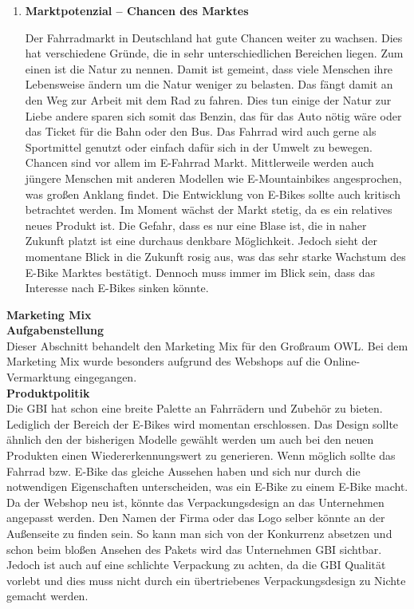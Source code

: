 \begin{enumerate}
	\item{\textbf{Marktpotenzial – Chancen des Marktes}}
	
Der Fahrradmarkt in Deutschland hat gute Chancen weiter zu wachsen. Dies hat verschiedene Gründe, die in sehr unterschiedlichen Bereichen liegen. Zum einen ist die Natur zu nennen. Damit ist gemeint, dass viele Menschen ihre Lebensweise ändern um die Natur weniger zu belasten. Das fängt damit an den Weg zur Arbeit mit dem Rad zu fahren. Dies tun einige der Natur zur Liebe andere sparen sich somit das Benzin, das für das Auto nötig wäre oder das Ticket für die Bahn oder den Bus. Das Fahrrad wird auch gerne als Sportmittel genutzt oder einfach dafür sich in der Umwelt zu bewegen.
Chancen sind vor allem im E-Fahrrad Markt. Mittlerweile werden auch jüngere Menschen mit anderen Modellen wie E-Mountainbikes angesprochen, was großen Anklang findet.
Die Entwicklung von E-Bikes sollte auch kritisch betrachtet werden. Im Moment wächst der Markt stetig, da es ein relatives neues Produkt ist. Die Gefahr, dass es nur eine Blase ist, die in naher Zukunft platzt ist eine durchaus denkbare  Möglichkeit. Jedoch sieht der momentane Blick in die Zukunft rosig aus, was das sehr starke Wachstum des E-Bike Marktes bestätigt. Dennoch muss immer im Blick sein, dass das Interesse nach E-Bikes sinken könnte.

\end{enumerate}
\textbf{Marketing Mix}\\

\small{\textbf{Aufgabenstellung}}\\
Dieser Abschnitt behandelt den Marketing Mix für den Großraum OWL. Bei dem Marketing Mix wurde besonders aufgrund des Webshops auf die Online-Vermarktung eingegangen.\\

\small{\textbf{Produktpolitik}}\\
Die GBI hat schon eine breite Palette an Fahrrädern und Zubehör zu bieten. Lediglich der Bereich der E-Bikes wird momentan erschlossen. Das Design sollte ähnlich den der bisherigen Modelle gewählt werden um auch bei den neuen Produkten einen Wiedererkennungswert zu generieren. Wenn möglich sollte das Fahrrad bzw. E-Bike das gleiche Aussehen haben und sich nur durch die notwendigen Eigenschaften unterscheiden, was ein E-Bike zu einem E-Bike macht.\\
Da der Webshop neu ist, könnte das Verpackungsdesign an das Unternehmen angepasst werden. Den Namen der Firma oder das Logo selber könnte an der Außenseite zu finden sein. So kann man sich von der Konkurrenz absetzen und schon beim bloßen Ansehen des Pakets wird das Unternehmen GBI sichtbar. Jedoch ist auch auf eine schlichte Verpackung zu achten, da die GBI Qualität vorlebt und dies muss nicht durch ein übertriebenes Verpackungsdesign zu Nichte gemacht werden.\\

